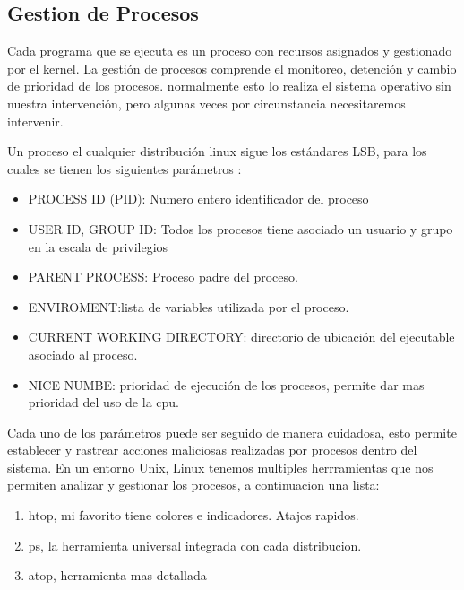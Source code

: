 \documentclass[paper=a4, fontsize=12pt]{article} 		%
\numberwithin{equation}{section}						%
\numberwithin{table}{section} 							%
\begin{document}
\subsection{Gestion de Procesos}
Cada programa que se ejecuta es un proceso con recursos asignados y gestionado por el kernel. La gestión de procesos comprende el  monitoreo, detención y cambio de prioridad de los procesos. normalmente esto lo realiza el sistema operativo sin nuestra intervención, pero algunas veces por circunstancia necesitaremos intervenir.

Un proceso el cualquier distribución linux sigue los estándares LSB, para los cuales se tienen  los siguientes parámetros :
\begin{itemize}
\item PROCESS ID (PID): Numero entero identificador del proceso
\item USER ID, GROUP ID: Todos los procesos tiene asociado un usuario y grupo en la escala de privilegios
\item PARENT PROCESS: Proceso padre del proceso.
\item ENVIROMENT:lista de variables utilizada por el proceso.
\item CURRENT WORKING DIRECTORY: directorio de ubicación del ejecutable asociado al proceso.
\item NICE NUMBE: prioridad de ejecución de los procesos, permite dar mas prioridad del uso de la cpu.
\end{itemize}
Cada uno de los parámetros puede ser seguido de manera cuidadosa, esto permite establecer y rastrear acciones maliciosas realizadas por procesos dentro del sistema.
En un entorno Unix, Linux tenemos multiples herrramientas que nos permiten analizar y gestionar los procesos, a continuacion una lista: 
\begin{enumerate}
\item htop, mi favorito tiene colores e indicadores. Atajos rapidos.
\item ps, la herramienta universal  integrada con cada distribucion. 
\item atop, herramienta mas detallada
\end{enumerate}
\end{document}

